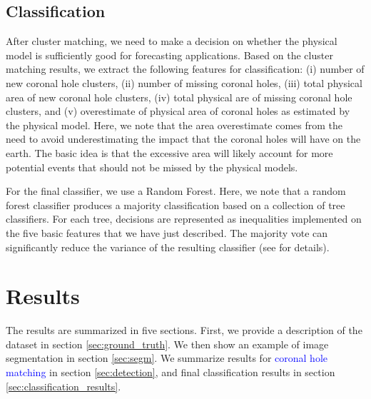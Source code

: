 \documentclass[journal]{IEEEtran}
\begin{document}
\subsection{Classification}\label{sec:Classification}
After cluster matching, we need to make a decision
     on whether the physical model is sufficiently good for forecasting
     applications.
Based on the cluster matching results, we extract the following features for classification:
 (i)   number of new coronal hole clusters,
 (ii)  number of missing coronal holes,
 (iii) total physical area of new coronal hole clusters, 
 (iv)  total physical are of missing coronal hole clusters, and
 (v)   overestimate of physical area of coronal holes as estimated by the physical model.
Here, we note that the area overestimate comes from the need to avoid underestimating
   the impact that the coronal holes will have on the earth.
The basic idea is that the excessive area will likely account for 
   more potential events that should not be missed by the physical models.
        
For the final classifier, we use a Random Forest. Here, we note that a random forest classifier produces a majority classification based on a collection of tree classifiers. For each tree, decisions are represented as inequalities implemented on the five basic features that we have just described. The majority vote can significantly reduce the variance of the resulting classifier (see   
   \cite{Breiman2001,ESLII} for details).
   

\section{Results} \label{sec:results}
The results are summarized in five sections.
First, we provide a description of the dataset in section \ref{sec:ground_truth}.
We then show an example of image segmentation in section \ref{sec:segm}.
We summarize results for \textcolor{blue}{coronal hole matching}
   in section \ref{sec:detection},
   and final classification
   results in section \ref{sec:classification_results}.
\end{document}
